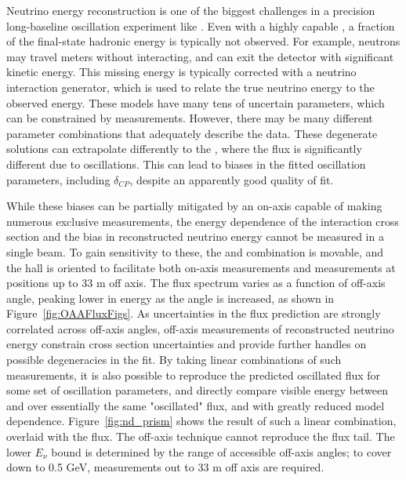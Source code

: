 Neutrino energy reconstruction is one of the biggest challenges in a precision long-baseline oscillation experiment like . Even with a highly capable , a fraction of the final-state hadronic energy is typically not observed. For example, neutrons may travel meters without interacting, and can exit the detector with significant kinetic energy. This missing energy is typically corrected with a neutrino interaction generator, which is used to relate the true neutrino energy to the observed energy. These models have many tens of uncertain parameters, which can be constrained by  measurements. However, there may be many different parameter combinations that adequately describe the  data. These degenerate solutions can extrapolate differently to the , where the flux is significantly different due to oscillations. This can lead to biases in the fitted oscillation parameters, including $\delta_{CP}$, despite an apparently good quality of fit.

While these biases can be partially mitigated by an on-axis  capable of making numerous exclusive measurements, the energy dependence of the interaction cross section and the bias in reconstructed neutrino energy cannot be measured in a single beam. To gain sensitivity to these, the  and  combination is movable, and the  hall is oriented to facilitate both on-axis measurements and measurements at positions up to 33 m off axis. The flux spectrum varies as a function of off-axis angle, peaking lower in energy as the angle is increased, as shown in Figure~\ref{fig:OAAFluxFigs}. As uncertainties in the flux prediction are strongly correlated across off-axis angles, off-axis measurements of reconstructed neutrino energy constrain cross section uncertainties and provide further handles on possible degeneracies in the fit. By taking linear combinations of such measurements, it is also possible to reproduce the predicted  oscillated flux for some set of oscillation parameters, and directly compare visible energy between  and  over essentially the same "oscillated" flux, and with greatly reduced model dependence. Figure~\ref{fig:nd_prism} shows the result of such a linear combination, overlaid with the  flux. The off-axis technique cannot reproduce the  flux tail. The lower $E_{\nu}$ bound is determined by the range of accessible off-axis angles; to cover down to 0.5 GeV, measurements out to 33 m off axis are required.

